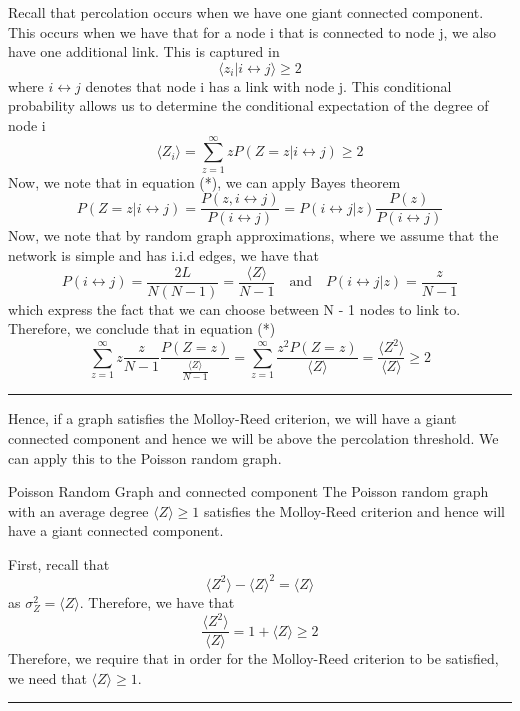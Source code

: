 \documentclass[twoside]{article}
\newenvironment{proof}{{\bf Proof:}}{\hfill\rule{2mm}{2mm}}
\begin{document}
\begin{proof} Recall that percolation occurs when we have one giant connected component. This occurs when we have that for a node i that is connected to node j, we also have one additional link. This is captured in 
$$
\langle z_i| i \leftrightarrow j \rangle \geq 2
$$
where $i \leftrightarrow j$ denotes that node i has a link with node j. This conditional probability allows us to determine the conditional expectation of the degree of node i 
\begin{equation}
\langle Z_i \rangle = \sum_{z=1}^{\infty}zP(Z=z|i \leftrightarrow j) \geq 2
\tag{*}
\end{equation}
Now, we note that in equation (*), we can apply Bayes theorem
$$
P(Z=z|i \leftrightarrow j) = \frac{P(z, i \leftrightarrow j)}{P(i \leftrightarrow j)} = P(i \leftrightarrow j|z)\frac{P(z)}{P(i \leftrightarrow j)}
$$
Now, we note that by random graph approximations, where we assume that the network is simple and has i.i.d edges, we have that 
$$
P(i \leftrightarrow j) = \frac{2L}{N(N - 1)} = \frac{\langle Z \rangle}{N - 1} \quad \text{and} \quad P(i \leftrightarrow j| z) = \frac{z}{N - 1}
$$
which express the fact that we can choose between N - 1 nodes to link to. Therefore, we conclude that in equation (*)
$$
\sum_{z=1}^{\infty}z\frac{z}{N - 1}\frac{P(Z=z)}{\frac{\langle Z \rangle}{N - 1}} = \sum_{z=1}^{\infty}\frac{z^2P(Z = z)}{\langle Z \rangle} = \frac{\langle Z^2 \rangle}{\langle Z \rangle} \geq 2
$$
\end{proof}

Hence, if a graph satisfies the Molloy-Reed criterion, we will have a giant connected component and hence we will be above the percolation threshold. We can apply this to the Poisson random graph.

\begin{proposition_exam}{Poisson Random Graph and connected component}{} The Poisson random graph with an average degree $\langle Z \rangle \geq 1$ satisfies the Molloy-Reed criterion and hence will have a giant connected component.
\end{proposition_exam}

\begin{proof} First, recall that 
$$
\langle Z^2 \rangle - \langle Z \rangle^2 = \langle Z \rangle
$$
as $\sigma_Z^2 = \langle Z \rangle.$ Therefore, we have that 
$$
\frac{\langle Z^2 \rangle}{\langle Z \rangle} = 1 + \langle Z \rangle \geq 2
$$
Therefore, we require that in order for the Molloy-Reed criterion to be satisfied, we need that $\langle Z \rangle \geq 1.$
\end{proof}
\end{document}
